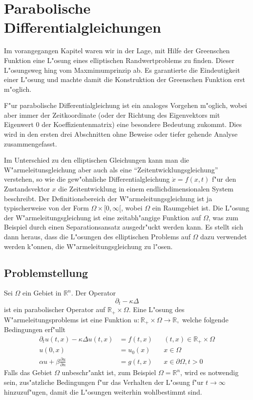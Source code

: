 %
%
%
\chapter{Parabolische Differentialgleichungen\label{chapter-parabolisch}}
\rhead{}
Im vorangegangen Kapitel waren wir in der Lage, mit Hilfe der Greenschen
Funktion eine L"osung eines elliptischen Randwertproblems zu finden.
Dieser L"osungsweg hing vom Maxmimumprinzip ab.
Es garantierte die Eindeutigkeit einer
L"osung und machte damit die Konstruktion der Greenschen Funktion
erst m"oglich.

F"ur parabolische Differentialgleichung ist ein analoges Vorgehen
m"oglich, wobei aber immer der Zeitkoordinate (oder der Richtung
des Eigenvektors mit Eigenwert $0$ der Koeffizientenmatrix)
eine besondere Bedeutung zukommt.
Dies wird in den ersten drei
Abschnitten ohne Beweise  oder tiefer gehende Analyse zusammengefasst.

Im Unterschied zu den elliptischen
Gleichungen kann man die W"armeleitunsgleichung aber auch
als eine ``Zeitentwicklungsgleichung'' verstehen, so wie die
gew"ohnliche Differentialgleichung $\dot x=f(x,t)$
f"ur den Zustandsvektor $x$ die Zeitentwicklung in einem endlichdimensionalen
System beschreibt. Der Definitionsbereich der W"armeleitungsgleichung
ist ja typischerweise von der Form $\Omega\times[0,\infty[$, wobei
$\Omega$ ein Raumgebiet ist.
Die L"osung der W"armeleitungsgleichung ist eine zeitabh"angige Funktion
auf $\Omega$, was zum Beispiel durch einen Separationsansatz
ausgedr"uckt werden kann. Es stellt sich dann heraus, dass die L"osungen
des elliptischen Problems auf $\Omega$ dazu verwendet werden k"onnen,
die W"armeleitungsgleichung zu l"osen.

\section{Problemstellung}
Sei $\Omega$ ein Gebiet in $\mathbb R^n$. Der Operator 
\[
\partial_t-\kappa\Delta
\]
ist ein parabolischer Operator auf $\mathbb R_+\times \Omega$.
Eine L"osung des W"armeleitungsproblems ist eine Funktion
$u\colon\mathbb R_+\times\Omega\to\mathbb R,$
welche folgende Bedingungen erf"ullt
\begin{align*}
\partial_tu(t,x)-\kappa\Delta u(t,x)&=f(t,x)&&(t,x)\in\mathbb R_+\times\Omega
\\
u(0,x)&=u_0(x)&&x\in\Omega
\\
\alpha u+\beta\frac{\partial u}{\partial n}&=g(t, x)&&x\in\partial\Omega, t>0
\end{align*}
Falls das Gebiet $\Omega$ unbeschr"ankt ist, zum Beispiel $\Omega=\mathbb R^n$,
wird es notwendig sein, zus"atzliche Bedingungen f"ur das Verhalten
der L"osung f"ur $t\to\infty$ hinzuzuf"ugen, damit die L"osungen weiterhin
wohlbestimmt sind.

